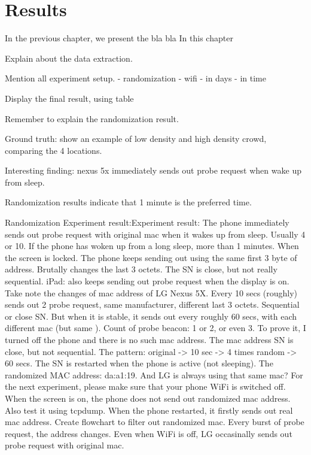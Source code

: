 \chapter{Results}
\label{ch:results} %
In the previous chapter, we present the bla bla
In this chapter

Explain about the data extraction.

Mention all experiment setup.
- randomization
- wifi
	- in days
	- in time

Display the final result, using table

Remember to explain the randomization result.

Ground truth: show an example of low density and high density crowd, comparing the 4 locations.

Interesting finding: nexus 5x immediately sends out probe request when wake up from sleep.

Randomization results indicate that 1 minute is the preferred time.

Randomization Experiment result:Experiment result:
The phone immediately sends out probe request with original mac when it wakes up from sleep. Usually 4 or 10. If the phone has woken up from a long sleep, more than 1 minutes. When the screen is locked.
The phone keeps sending out using the same first 3 byte of address. Brutally changes the last 3 octets.
The SN is close, but not really sequential.
iPad: also keeps sending out probe request when the display is on.
Take note the changes of mac address of LG Nexus 5X.
Every 10 secs (roughly) sends out 2 probe request, same manufacturer, different last 3 octets. Sequential or close SN.
But when it is stable, it sends out every roughly 60 secs, with each different mac (but same ). Count of probe beacon: 1 or 2, or even 3.
To prove it, I turned off the phone and there is no such mac address.
The mac address SN is close, but not sequential.
The pattern: original -> 10 sec -> 4 times random -> 60 secs.
The SN is restarted when the phone is active (not sleeping).
The randomized MAC address: da:a1:19. And LG is always using that same mac?
For the next experiment, please make sure that your phone WiFi is switched off.
When the screen is on, the phone does not send out randomized mac address.
Also test it using tcpdump.
When the phone restarted, it firstly sends out real mac address.
Create flowchart to filter out randomized mac.
Every burst of probe request, the address changes.
Even when WiFi is off, LG occasinally sends out probe request with original mac.


